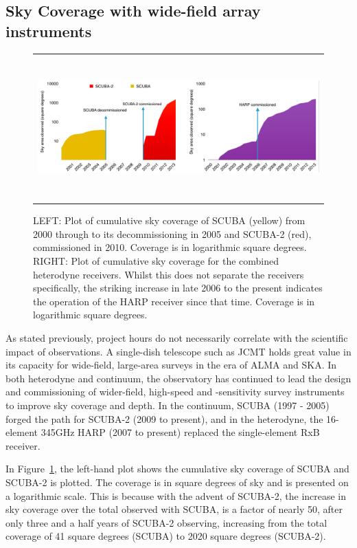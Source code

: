 \documentclass[]{spie}  %
\begin{document}
\subsection{Sky Coverage with wide-field array instruments}
\begin{figure}[h]
   \begin{center}
   \begin{tabular}{c}
   \includegraphics[height=5.5cm]{jcmt_cumulativearea}
   \end{tabular}
   \end{center}
   \caption{\label{fig:sc2} LEFT: Plot of cumulative sky coverage of SCUBA (yellow) from 2000 through to its decommissioning in 2005 and SCUBA-2 (red), commissioned in 2010. Coverage is in logarithmic square degrees. RIGHT: Plot of cumulative sky coverage for the combined heterodyne receivers. Whilst this does not separate the receivers specifically, the striking increase in late 2006 to the present indicates the operation of the HARP receiver since that time. Coverage is in logarithmic square degrees.}
\end{figure}
As stated previously, project hours do not necessarily correlate with
the scientific impact of observations. A single-dish telescope such as
JCMT holds great value in its capacity for wide-field, large-area
surveys in the era of ALMA and SKA. In both heterodyne and continuum,
the observatory has continued to lead the design and commissioning of
wider-field, high-speed and -sensitivity survey instruments to improve
sky coverage and depth. In the continuum, SCUBA (1997 - 2005) forged
the path for SCUBA-2 (2009 to present), and in the heterodyne, the
16-element 345GHz HARP (2007 to present) replaced the single-element
RxB receiver.\cite{1998SPIE.3357..620C}

In Figure~\ref{fig:sc2}, the left-hand plot shows the cumulative sky
coverage of SCUBA and SCUBA-2 is plotted. The coverage is in square
degrees of sky and is presented on a logarithmic scale. This is
because with the advent of SCUBA-2, the increase in sky coverage over
the total observed with SCUBA, is a factor of nearly 50, after only
three and a half years of SCUBA-2 observing, increasing from the total
coverage of 41 square degrees (SCUBA) to 2020 square degrees
(SCUBA-2).
\end{document}
